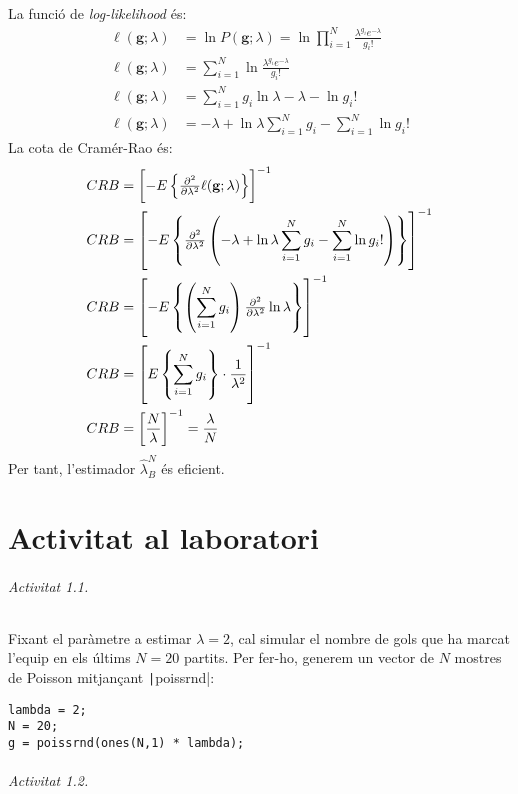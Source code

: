 \documentclass[catalan]{scrartcl}
\begin{document}
La funció de \emph{log-likelihood} és:
%
\begin{align}
  \ell(\mathbf{g};\lambda) &= \ln P(\mathbf{g};\lambda) =
    \ln \prod_{i=1}^N \frac{\lambda^{g_i} e^{-\lambda}}{g_i!}
\\
  \ell(\mathbf{g};\lambda) &=
    \sum_{i=1}^N \ln \frac{\lambda^{g_i} e^{-\lambda}}{g_i!}
\\
  \ell(\mathbf{g};\lambda) &=
    \sum_{i=1}^N g_i \ln \lambda -\lambda - \ln g_i!
\\
  \ell(\mathbf{g};\lambda) &=
    -\lambda + \ln \lambda \sum_{i=1}^N g_i - \sum_{i=1}^N \ln g_i!
\end{align}
%
La cota de Cramér-Rao és:
%
\begin{align}
  CRB &= \left[ -E\left\{ \pd[2]{}{\lambda} \ell(\mathbf{g};\lambda) \right\} \right]^{-1}
\\
  CRB &= \left[ -E\left\{ \pd[2]{}{\lambda}
    \left(-\lambda + \ln \lambda \sum_{i=1}^N g_i - \sum_{i=1}^N \ln g_i! \right)
  \right\} \right]^{-1}
\\
  CRB &= \left[ -E\left\{ \left(\sum_{i=1}^N g_i\right) \pd[2]{}{\lambda}
    \ln \lambda
  \right\} \right]^{-1}
\\
  CRB &= \left[ E\left\{ \sum_{i=1}^N g_i
  \right\} \cdot \frac{1}{\lambda^2} \right]^{-1}
\\
  CRB &= \left[ \frac{N}{\lambda} \right]^{-1} = \frac{\lambda}{N}
\end{align}
%
Per tant, l'estimador $\hat{\lambda}_B^N$ és eficient.


\part{Activitat al laboratori}

\paragraph{Activitat 1.1.}

Fixant el paràmetre a estimar $\lambda = 2$, cal simular el nombre de gols
que ha marcat l'equip en els últims $N = 20$ partits. Per fer-ho, generem
un vector de $N$ mostres de Poisson mitjançant \texttt|poissrnd|:

\begin{verbatim}
lambda = 2;
N = 20;
g = poissrnd(ones(N,1) * lambda);
\end{verbatim}

\paragraph{Activitat 1.2.}
\end{document}
